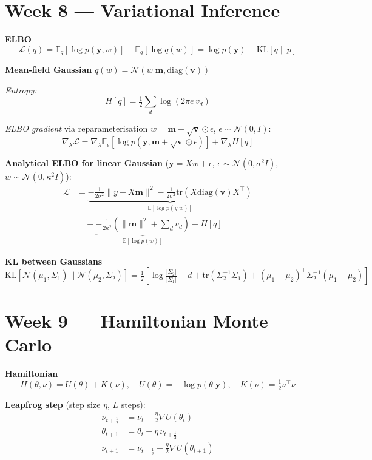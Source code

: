 \documentclass[9pt,a4paper]{extarticle}
\newcommand{\N}{\mathcal{N}}
\newcommand{\E}{\mathbb{E}}
\newcommand{\KL}{\mathrm{KL}}
\newcommand{\tr}{\mathrm{tr}}
\newcommand{\diag}{\mathrm{diag}}
\renewcommand{\vec}[1]{\bm{#1}}
\begin{document}
\section{Week 8 — Variational Inference}

\textbf{ELBO}
\[
\mathcal{L}(q) = \E_q[\log p(\vec{y},w)] - \E_q[\log q(w)] = \log p(\vec{y}) - \KL[q\|p]
\]

\textbf{Mean-field Gaussian} $q(w)=\N(w|\vec{m},\diag(\vec{v}))$

\textit{Entropy:}
\[
H[q] = \tfrac{1}{2}\sum_d\log(2\pi e\, v_d)
\]

\textit{ELBO gradient} via reparameterisation $w=\vec{m}+\sqrt{\vec{v}}\odot\epsilon$, $\epsilon\sim\N(0,I)$:
\[
\nabla_\lambda\mathcal{L} = \nabla_\lambda\E_{\epsilon}[\log p(\vec{y},\vec{m}+\sqrt{\vec{v}}\odot\epsilon)] + \nabla_\lambda H[q]
\]

\textbf{Analytical ELBO for linear Gaussian} ($\vec{y}=X w+\epsilon$, $\epsilon\sim\N(0,\sigma^2 I)$, $w\sim\N(0,\kappa^2 I)$):
\begin{align*}
\mathcal{L} &= \underbrace{-\tfrac{1}{2\sigma^2}\|y-X\vec{m}\|^2 - \tfrac{1}{2\sigma^2}\tr(X\diag(\vec{v})X^\top)}_{\E[\log p(y|w)]} \\
&\quad+\underbrace{-\tfrac{1}{2\kappa^2}(\|\vec{m}\|^2+\sum_d v_d)}_{\E[\log p(w)]}+H[q]
\end{align*}

\textbf{KL between Gaussians}
\[
\KL[\N(\mu_1,\Sigma_1)\|\N(\mu_2,\Sigma_2)] = \tfrac{1}{2}\!\left[\log\tfrac{|\Sigma_2|}{|\Sigma_1|}-d+\tr(\Sigma_2^{-1}\Sigma_1)+(\mu_1-\mu_2)^\top\Sigma_2^{-1}(\mu_1-\mu_2)\right]
\]

\section{Week 9 — Hamiltonian Monte Carlo}

\textbf{Hamiltonian}
\[
H(\theta,\nu) = U(\theta)+K(\nu),\quad U(\theta)=-\log p(\theta|\vec{y}),\quad K(\nu)=\tfrac{1}{2}\nu^\top\nu
\]

\textbf{Leapfrog step} (step size $\eta$, $L$ steps):
\begin{align*}
\nu_{t+\frac{1}{2}} &= \nu_t - \tfrac{\eta}{2}\nabla U(\theta_t)\\
\theta_{t+1} &= \theta_t + \eta\,\nu_{t+\frac{1}{2}}\\
\nu_{t+1} &= \nu_{t+\frac{1}{2}} - \tfrac{\eta}{2}\nabla U(\theta_{t+1})
\end{align*}
\end{document}
